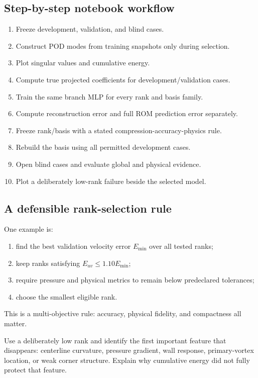 \documentclass[11pt]{article}
\begin{document}
\subsection{Step-by-step notebook workflow}
\begin{enumerate}
\item Freeze development, validation, and blind cases.
\item Construct POD modes from training snapshots only during selection.
\item Plot singular values and cumulative energy.
\item Compute true projected coefficients for development/validation cases.
\item Train the same branch MLP for every rank and basis family.
\item Compute reconstruction error and full ROM prediction error separately.
\item Freeze rank/basis with a stated compression-accuracy-physics rule.
\item Rebuild the basis using all permitted development cases.
\item Open blind cases and evaluate global and physical evidence.
\item Plot a deliberately low-rank failure beside the selected model.
\end{enumerate}

\subsection{A defensible rank-selection rule}
One example is:
\begin{enumerate}
\item find the best validation velocity error $E_{\min}$ over all tested ranks;
\item keep ranks satisfying $E_{uv}\le1.10E_{\min}$;
\item require pressure and physical metrics to remain below predeclared tolerances;
\item choose the smallest eligible rank.
\end{enumerate}
This is a multi-objective rule: accuracy, physical fidelity, and compactness all matter.

\begin{failurebox}
Use a deliberately low rank and identify the first important feature that disappears: centerline curvature, pressure gradient, wall response, primary-vortex location, or weak corner structure. Explain why cumulative energy did not fully protect that feature.
\end{failurebox}
\end{document}
